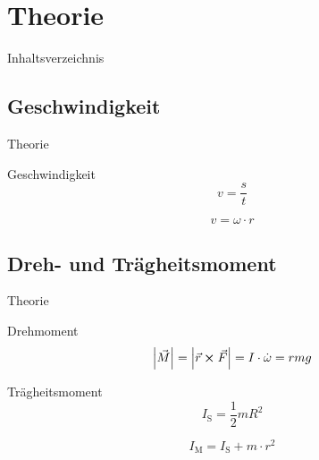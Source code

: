 \section{Theorie}

\begin{frame}{Inhaltsverzeichnis}
\end{frame} 

\subsection{Geschwindigkeit}
\begin{frame}{Theorie}
    \begin{block}{Geschwindigkeit}    
    \begin{equation*}
        v= \frac{s}{t}
    \end{equation*}
    
    \begin{equation*}
        v = \omega \cdot r
    \end{equation*}
\end{block}
\end{frame}

\subsection{Dreh- und Trägheitsmoment}

\begin{frame}{Theorie}
    \begin{block}{Drehmoment}
    \begin{equation}
        \abs{\vec{M}} = \abs{ \vec{r} \cross \vec{F} } = I \cdot \dot{\omega} = r m g
        \label{eqn:drehmoment}
    \end{equation}
    \end{block}

    \begin{block}{Trägheitsmoment}
    \begin{equation}
        I_\text{S}= \frac{1}{2} m R^2 
        \label{eqn:trägheit}
    \end{equation}

    \begin{equation}
        I_\text{M} = I_\text{S}+ m \cdot r^2
        \label{eqn:steiner}
    \end{equation}
    \end{block}
\end{frame}



